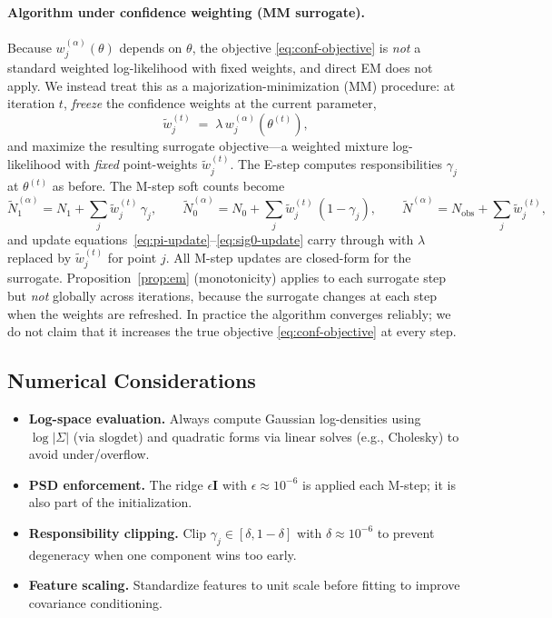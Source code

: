 \documentclass[11pt]{article}
\theoremstyle{definition}
\newcommand{\bI}{\mathbf{I}}
\newcommand{\lam}{\lambda}
\newcommand{\Sig}{\Sigma}
\begin{document}
\paragraph{Algorithm under confidence weighting (MM surrogate).}
Because \(w_j^{(\alpha)}(\theta)\) depends on \(\theta\), the objective
\eqref{eq:conf-objective} is \emph{not} a standard weighted log-likelihood
with fixed weights, and direct EM does not apply.
We instead treat this as a majorization-minimization (MM) procedure:
at iteration \(t\), \emph{freeze} the confidence weights at the current parameter,
\[
\tilde w_j^{(t)} \;=\; \lam\,w_j^{(\alpha)}(\theta^{(t)}),
\]
and maximize the resulting surrogate objective—a weighted mixture
log-likelihood with \emph{fixed} point-weights \(\tilde w_j^{(t)}\).
The E-step computes responsibilities \(\gamma_j\) at \(\theta^{(t)}\) as before.
The M-step soft counts become
\[
\widetilde N_1^{(\alpha)} = N_1 + \sum_j \tilde w_j^{(t)}\,\gamma_j,
\qquad
\widetilde N_0^{(\alpha)} = N_0 + \sum_j \tilde w_j^{(t)}\,(1-\gamma_j),
\qquad
\widetilde N^{(\alpha)} = N_{\mathrm{obs}} + \sum_j \tilde w_j^{(t)},
\]
and update equations~\eqref{eq:pi-update}--\eqref{eq:sig0-update} carry
through with \(\lam\) replaced by \(\tilde w_j^{(t)}\) for point \(j\).
All M-step updates are closed-form for the surrogate.
Proposition~\ref{prop:em} (monotonicity) applies to each surrogate step
but \emph{not} globally across iterations, because the surrogate changes at
each step when the weights are refreshed.
In practice the algorithm converges reliably; we do not claim that it
increases the true objective \eqref{eq:conf-objective} at every step.

\subsection{Numerical Considerations}

\begin{itemize}[leftmargin=1.2em]
\item \textbf{Log-space evaluation.}
      Always compute Gaussian log-densities using \(\log|\Sig|\) (via
      \(\mathrm{slogdet}\)) and quadratic forms via linear solves
      (e.g., Cholesky) to avoid under/overflow.
\item \textbf{PSD enforcement.}
      The ridge \(\epsilon\bI\) with \(\epsilon\approx 10^{-6}\) is applied
      each M-step; it is also part of the initialization.
\item \textbf{Responsibility clipping.}
      Clip \(\gamma_j \in [\delta,1-\delta]\) with \(\delta\approx 10^{-6}\)
      to prevent degeneracy when one component wins too early.
\item \textbf{Feature scaling.}
      Standardize features to unit scale before fitting to improve
      covariance conditioning.
\end{itemize}
\end{document}
